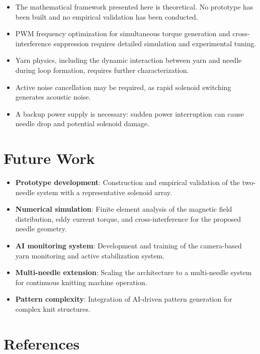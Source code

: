 \documentclass[12pt, a4paper]{article}
\begin{document}
\begin{itemize}
    \item The mathematical framework presented here is theoretical.
    No prototype has been built and no empirical validation has been
    conducted.
    \item PWM frequency optimization for simultaneous torque generation
    and cross-interference suppression requires detailed simulation and
    experimental tuning.
    \item Yarn physics, including the dynamic interaction between yarn
    and needle during loop formation, requires further characterization.
    \item Active noise cancellation may be required, as rapid solenoid
    switching generates acoustic noise.
    \item A backup power supply is necessary: sudden power interruption
    can cause needle drop and potential solenoid damage.
\end{itemize}

\section{Future Work}

\begin{itemize}
    \item \textbf{Prototype development}: Construction and empirical
    validation of the two-needle system with a representative solenoid
    array.
    \item \textbf{Numerical simulation}: Finite element analysis of
    the magnetic field distribution, eddy current torque, and
    cross-interference for the proposed needle geometry.
    \item \textbf{AI monitoring system}: Development and training of
    the camera-based yarn monitoring and active stabilization system.
    \item \textbf{Multi-needle extension}: Scaling the architecture
    to a multi-needle system for continuous knitting machine operation.
    \item \textbf{Pattern complexity}: Integration of AI-driven pattern
    generation for complex knit structures.
\end{itemize}

\section*{References}
\end{document}
